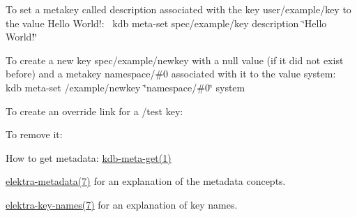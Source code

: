 To set a metakey called {\ttfamily description} associated with the key {\ttfamily user/example/key} to the value {\ttfamily Hello World!}\+:~\newline
 {\ttfamily kdb meta-\/set spec/example/key description \char`\"{}\+Hello World!\char`\"{}}

To create a new key {\ttfamily spec/example/newkey} with a null value (if it did not exist before) and a metakey {\ttfamily namespace/\#0} associated with it to the value {\ttfamily system}\+:~\newline
 {\ttfamily kdb meta-\/set /example/newkey \char`\"{}namespace/\#0\char`\"{} system}

To create an override link for a {\ttfamily /test} key\+:




To remove it\+:





\begin{DoxyItemize}
\item How to get metadata\+: \hyperlink{doc_help_kdb-meta-get_md}{kdb-\/meta-\/get(1)}
\item \hyperlink{doc_help_elektra-metadata_md}{elektra-\/metadata(7)} for an explanation of the metadata concepts.
\item \hyperlink{doc_help_elektra-key-names_md}{elektra-\/key-\/names(7)} for an explanation of key names. 
\end{DoxyItemize}